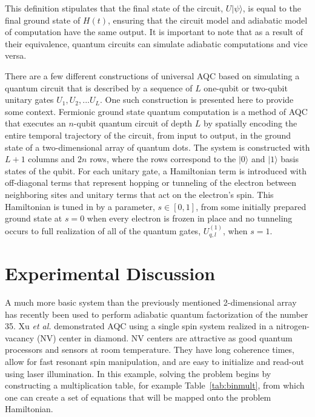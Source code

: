 \documentclass[%
 reprint,
 amsmath,amssymb,
 aps,
]{revtex4-1}
\begin{document}
   This definition stipulates that the final state of the circuit, $U\vert\psi\rangle$, is equal to the final ground state of $H(t)$, ensuring that the circuit model and adiabatic model of computation have the same output. It is important to note that as a result of their equivalence, quantum circuits can simulate adiabatic computations\cite{Farhi2000} and vice versa\cite{Aharanov2007}.
   
   There are a few different constructions of universal AQC based on simulating a quantum circuit that is described by a sequence of $L$ one-qubit or two-qubit unitary gates $U_1 , U_2 , ... U_L$. One such construction is presented here to provide some context. Fermionic ground state quantum computation is a method of AQC that executes an $n$-qubit quantum circuit of depth $L$ by spatially encoding the entire temporal trajectory of the circuit, from input to output, in the ground state of a two-dimensional array of quantum dots\cite{Mizel2001}. The system is constructed with $L+1$ columns and $2n$ rows, where the rows correspond to the $\vert 0 \rangle$ and $\vert 1 \rangle$ basis states of the qubit. For each unitary gate, a Hamiltonian term is introduced with off-diagonal terms that represent hopping or tunneling of the electron between neighboring sites and unitary terms that act on the electron's spin. This Hamiltonian is tuned in by a parameter, $s \in [0,1]$, from some initially prepared ground state at $s=0$ when every electron is frozen in place and no tunneling occurs to full realization of all of the quantum gates, $U^{(1)}_{q,l}$, when $s=1$.
   
   \section{Experimental Discussion}\label{sec:B}
   
   A much more basic system than the previously mentioned 2-dimensional array has recently been used to perform adiabatic quantum factorization of the number 35\cite{Xu2017}. Xu \textit{et al.} demonstrated AQC using a single spin system realized in a nitrogen-vacancy (NV) center in diamond. NV centers are attractive as good quantum processors and sensors at room temperature\cite{DOHERTY20131}. They have long coherence times, allow for fast resonant spin manipulation, and are easy to initialize and read-out using laser illumination. In this example, solving the problem begins by constructing a multiplication table, for example Table~\ref{tab:binmult}, from which one can create a set of equations that will be mapped onto the problem Hamiltonian.
   
\end{document}
